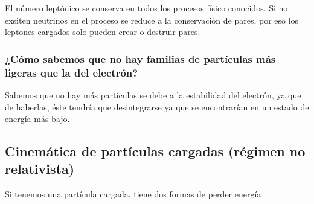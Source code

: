 El número leptónico se conserva en todos los procesos físico conocidos. Si no exsiten neutrinos en el proceso se reduce a la conservación de pares, por eso los leptones cargados solo pueden crear o destruir pares.
\subsubsection{¿Cómo sabemos que no hay familias de partículas más ligeras que la del electrón?}
Sabemos que no hay más partículas se debe a la estabilidad del electrón, ya que de haberlas, éste tendría que desintegrarse ya que se encontrarían en un estado de energía más bajo.
\newpage
\subsection{Cinemática de partículas cargadas (régimen no relativista)}
Si tenemos una partícula cargada, tiene dos formas de perder energía
